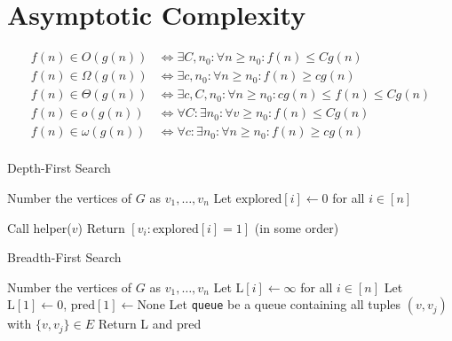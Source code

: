 \documentclass[twocolumn,a4paper,8pt]{extarticle}
\begin{document}
\section{Asymptotic Complexity}

\begin{align*}
f(n) \in O(g(n)) &\iff \exists C, n_0 : \forall n \geq n_0 : f(n)
\leq Cg(n) \\
f(n) \in \Omega(g(n)) &\iff \exists c, n_0 : \forall n \geq n_0 :
f(n) \geq cg(n) \\
f(n) \in \Theta(g(n)) &\iff \exists c, C, n_0 : \forall n \geq n_0 :
cg(n) \leq f(n) \leq Cg(n) \\
f(n) \in o(g(n)) &\iff \forall C : \exists n_0 : \forall v \geq n_0 :
f(n) \leq Cg(n) \\
f(n) \in \omega(g(n)) &\iff \forall c : \exists n_0 : \forall n \geq
n_0 : f(n) \geq cg(n) \\
\end{align*}


\begin{algorithm}
  \caption{Depth-First Search}

  Number the vertices of \(G\) as \(v_1, \dots, v_n\)\;
  Let \(\text{explored}[i] \gets 0\) for all \(i \in [n]\)\;

  Call helper(\(v\))\;
  Return \([v_i : \text{explored}[i] = 1]\) (in some order)\;
\end{algorithm}

\begin{algorithm}
  \caption{Breadth-First Search}

  Number the vertices of \(G\) as \(v_1, \dots, v_n\)\;
  Let \(\text{L}[i] \gets \infty\) for all \(i \in [n]\)\;
  Let \(\text{L}[1] \gets 0\), \(\text{pred}[1] \gets \text{None}\)\;
  Let \texttt{queue} be a queue containing all tuples \((v, v_j)\)
  with \(\{v, v_j\} \in E\)\;
  Return L and pred\;
\end{algorithm}
\end{document}

